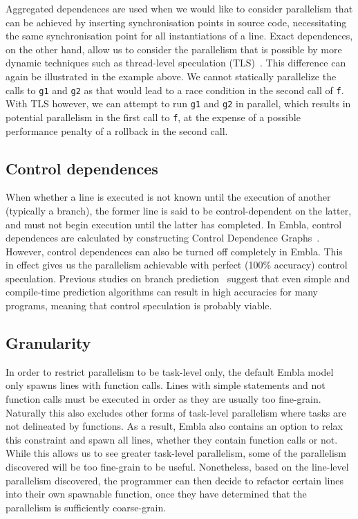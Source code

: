 Aggregated dependences are used when we would like to consider parallelism that can be achieved by inserting synchronisation points in source code, necessitating the same synchronisation point for all instantiations of a line.
Exact dependences, on the other hand, allow us to consider the parallelism that is possible by more dynamic techniques such as thread-level speculation (TLS)~\cite{Rundberg01anall-software,gregory05stampede, welc05safe}.
This difference can again be illustrated in the example above.
We cannot statically parallelize the calls to \texttt{g1} and \texttt{g2} as that would lead to a race condition in the second call of \texttt{f}.
With TLS however, we can attempt to run \texttt{g1} and \texttt{g2} in parallel, which results in potential parallelism in the first call to \texttt{f}, at the expense of a possible performance penalty of a rollback in the second call.

\subsection{Control dependences}
When whether a line is executed is not known until the execution of another (typically a branch), the former line is said to be control-dependent on the latter, and must not begin execution until the latter has completed.
In Embla, control dependences are calculated by constructing Control Dependence Graphs~\cite{ferrante87program}.
However, control dependences can also be turned off completely in Embla.
This in effect gives us the parallelism achievable with perfect (100\% accuracy) control speculation.
Previous studies on branch prediction~\cite{smith98study} suggest that even simple and compile-time prediction algorithms can result in high accuracies for many programs, meaning that control speculation is probably viable.

\subsection{Granularity}
In order to restrict parallelism to be task-level only, the default Embla model only spawns lines with function calls.
Lines with simple statements and not function calls must be executed in order as they are usually too fine-grain.
Naturally this also excludes other forms of task-level parallelism where tasks are not delineated by functions.
As a result, Embla also contains an option to relax this constraint and spawn all lines, whether they contain function calls or not.
While this allows us to see greater task-level parallelism, some of the parallelism discovered will be too fine-grain to be useful.
Nonetheless, based on the line-level parallelism discovered, the programmer can then decide to refactor certain lines into their own spawnable function, once they have determined that the parallelism is sufficiently coarse-grain.

